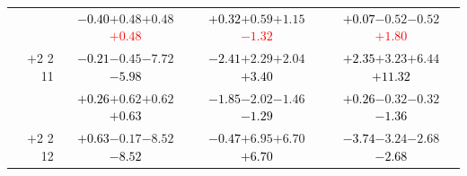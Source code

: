 \documentclass[compress]{beamer}
\begin{document}
\begin{frame}
\begin{tabular}{r | c | c | c}
          & \textcolor{black}{$-0.40$}\hspace{0.1 cm}$+0.48$\hspace{0.1 cm}$+0.48$\hspace{0.1 cm}\textcolor{red}{$+0.48$} & \textcolor{black}{$+0.32$}\hspace{0.1 cm}$+0.59$\hspace{0.1 cm}$+1.15$\hspace{0.1 cm}\textcolor{red}{$-1.32$} & \textcolor{black}{$+0.07$}\hspace{0.1 cm}$-0.52$\hspace{0.1 cm}$-0.52$\hspace{0.1 cm}\textcolor{red}{$+1.80$} \\
$+$2 2 11 & \textcolor{black}{$-0.21$}\hspace{0.1 cm}$-0.45$\hspace{0.1 cm}$-7.72$\hspace{0.1 cm}\textcolor{black}{$-5.98$} & \textcolor{black}{$-2.41$}\hspace{0.1 cm}$+2.29$\hspace{0.1 cm}$+2.04$\hspace{0.1 cm}\textcolor{black}{$+3.40$} & \textcolor{black}{$+2.35$}\hspace{0.1 cm}$+3.23$\hspace{0.1 cm}$+6.44$\hspace{0.1 cm}\textcolor{black}{$+11.32$} \\
          & \textcolor{black}{$+0.26$}\hspace{0.1 cm}$+0.62$\hspace{0.1 cm}$+0.62$\hspace{0.1 cm}\textcolor{black}{$+0.63$} & \textcolor{black}{$-1.85$}\hspace{0.1 cm}$-2.02$\hspace{0.1 cm}$-1.46$\hspace{0.1 cm}\textcolor{black}{$-1.29$} & \textcolor{black}{$+0.26$}\hspace{0.1 cm}$-0.32$\hspace{0.1 cm}$-0.32$\hspace{0.1 cm}\textcolor{black}{$-1.36$} \\
$+$2 2 12 & \textcolor{black}{$+0.63$}\hspace{0.1 cm}$-0.17$\hspace{0.1 cm}$-8.52$\hspace{0.1 cm}\textcolor{black}{$-8.52$} & \textcolor{black}{$-0.47$}\hspace{0.1 cm}$+6.95$\hspace{0.1 cm}$+6.70$\hspace{0.1 cm}\textcolor{black}{$+6.70$} & \textcolor{black}{$-3.74$}\hspace{0.1 cm}$-3.24$\hspace{0.1 cm}$-2.68$\hspace{0.1 cm}\textcolor{black}{$-2.68$} \\

\end{tabular}
\end{frame}
\end{document}
